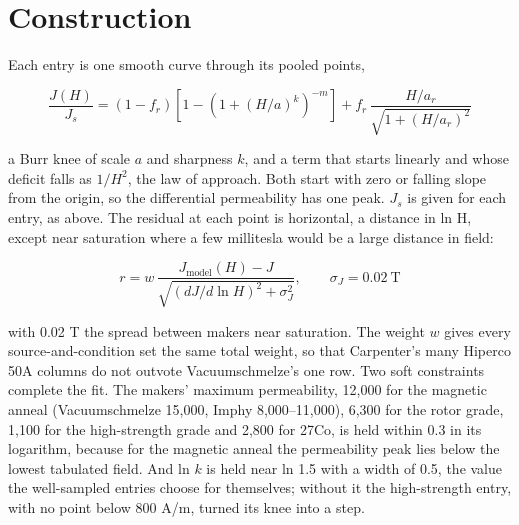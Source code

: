 \documentclass[
  11pt,
]{article}
\begin{document}
\section{Construction}\label{construction}

Each entry is one smooth curve through its pooled points,

\begin{equation}\label{eq:form}
\frac{J(H)}{J_s} = (1-f_r)\left[1-\left(1+(H/a)^{k}\right)^{-m}\right] + f_r\,\frac{H/a_r}{\sqrt{1+(H/a_r)^{2}}}
\end{equation}

a Burr knee of scale \(a\) and sharpness \(k\), and a term that starts linearly and whose deficit falls as \(1/H^{2}\), the law of approach. Both start with zero or falling slope from the origin, so the differential permeability has one peak. \(J_s\) is given for each entry, as above. The residual at each point is horizontal, a distance in ln H, except near saturation where a few millitesla would be a large distance in field:

\begin{equation}\label{eq:resid}
r = w\,\frac{J_{\text{model}}(H) - J}{\sqrt{\left(dJ/d\ln H\right)^{2} + \sigma_J^{2}}}, \qquad \sigma_J = 0.02\ \mathrm{T}
\end{equation}

with 0.02 T the spread between makers near saturation. The weight \(w\) gives every source-and-condition set the same total weight, so that Carpenter's many Hiperco 50A columns do not outvote Vacuumschmelze's one row. Two soft constraints complete the fit. The makers' maximum permeability, 12,000 for the magnetic anneal (Vacuumschmelze 15,000, Imphy 8,000--11,000), 6,300 for the rotor grade, 1,100 for the high-strength grade and 2,800 for 27Co, is held within 0.3 in its logarithm, because for the magnetic anneal the permeability peak lies below the lowest tabulated field. And ln \(k\) is held near ln 1.5 with a width of 0.5, the value the well-sampled entries choose for themselves; without it the high-strength entry, with no point below 800 A/m, turned its knee into a step.
\end{document}
